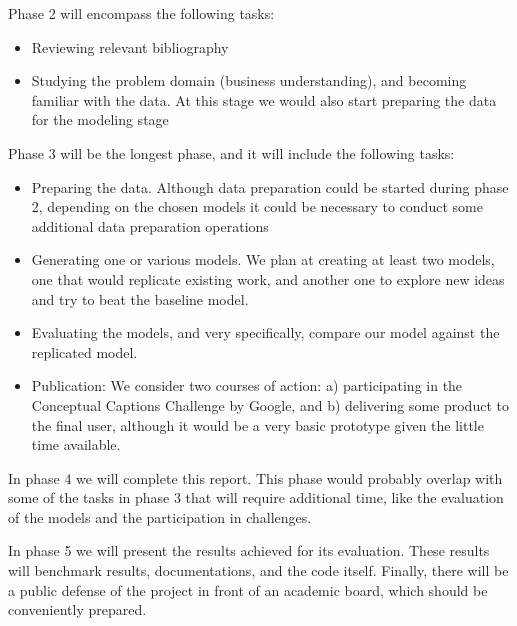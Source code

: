 Phase 2 will encompass the following tasks:
\begin{itemize}
\item Reviewing relevant bibliography
\item Studying the problem domain (business understanding), and becoming familiar with the data. At this stage we would also start preparing the data for the modeling stage
\end{itemize}

Phase 3 will be the longest phase, and it will include the following tasks:
\begin{itemize}
\item Preparing the data. Although data preparation could be started during phase 2, depending on the chosen models it could be necessary to conduct some additional data preparation operations
\item Generating one or various models. We plan at creating at least two models, one that would replicate existing work, and another one to explore new ideas and try to beat the baseline model.
\item Evaluating the models, and very specifically, compare our model against the replicated model.
\item Publication: We consider two courses of action: a) participating in the Conceptual Captions Challenge by Google, and b) delivering some product to the final user, although it would be a very basic prototype given the little time available.
\end{itemize}

In phase 4 we will complete this report. This phase would probably overlap with some of the tasks in phase 3 that will require additional time, like the evaluation of the models and the participation in challenges.

In phase 5 we will present the results achieved for its evaluation. These results will benchmark results, documentations, and the code itself. Finally, there will be a public defense of the project in front of an academic board, which should be conveniently prepared.

